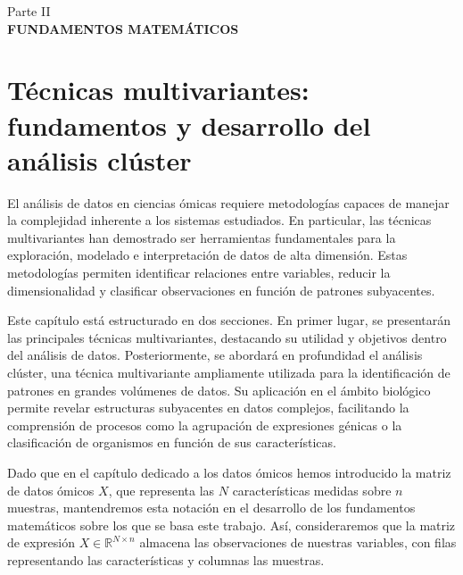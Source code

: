 
\newpage
\thispagestyle{empty}
\vspace*{\fill}
\begin{center}
    \large Parte II \\
    \vspace{0.5cm}           
    \LARGE \textbf{FUNDAMENTOS MATEMÁTICOS}
\end{center}
\vspace*{\fill}
\newpage
\setcounter{page}{1}  

\newpage

\chapter{Técnicas multivariantes: fundamentos y desarrollo del análisis clúster}

El análisis de datos en ciencias ómicas requiere metodologías capaces de manejar la complejidad 
inherente a los sistemas estudiados. En particular, las técnicas multivariantes han demostrado ser 
herramientas fundamentales para la exploración, modelado e interpretación de datos de alta dimensión. 
Estas metodologías permiten identificar relaciones entre variables, reducir la dimensionalidad y 
clasificar observaciones en función de patrones subyacentes. \newline

Este capítulo está estructurado en dos secciones. En primer lugar, se presentarán las principales 
técnicas multivariantes, destacando su utilidad y objetivos dentro del análisis de datos. Posteriormente, 
se abordará en profundidad el análisis clúster, una técnica multivariante ampliamente utilizada para 
la identificación de patrones en grandes volúmenes de datos. Su aplicación en el ámbito biológico 
permite revelar estructuras subyacentes en datos complejos, facilitando la comprensión de procesos 
como la agrupación de expresiones génicas o la clasificación de organismos en función de sus características. \newline

Dado que en el capítulo dedicado a los datos ómicos hemos introducido la matriz de datos ómicos $X$, que 
representa las $N$ características medidas sobre $n$ muestras, mantendremos esta notación en el desarrollo de
los fundamentos matemáticos sobre los que se basa este trabajo. Así, consideraremos que la matriz de expresión 
$X \in \mathbb{R}^{N \times n}$ almacena las observaciones de nuestras variables, con filas representando las
características y columnas las muestras. 



